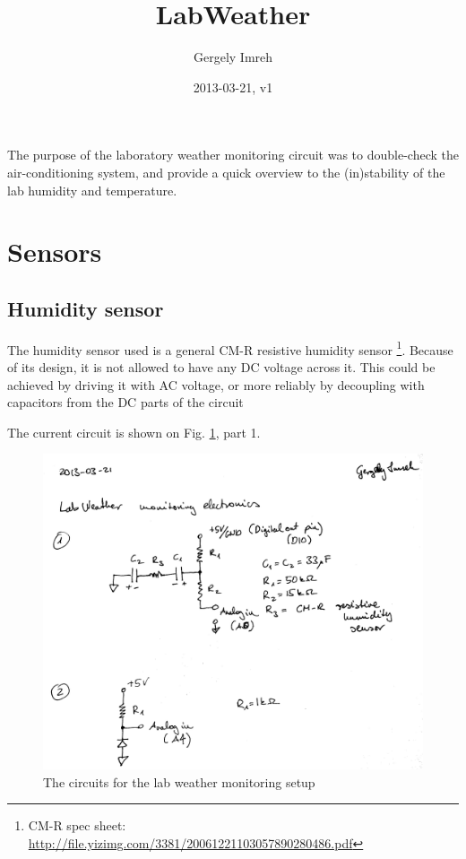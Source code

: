 \documentclass[12pt,a4paper]{article}
\author{Gergely Imreh}
\title{LabWeather}
\date{2013-03-21, v1}
\begin{document}
\maketitle

The purpose of the laboratory weather monitoring circuit was to double-check the air-conditioning system, and provide a quick overview to the (in)stability of the lab humidity and temperature.

\tableofcontents

\section{Sensors}

\subsection{Humidity sensor}

The humidity sensor used is a general CM-R resistive humidity sensor \footnote{CM-R spec sheet: \url{http://file.yizimg.com/3381/20061221103057890280486.pdf}}. Because of its design, it is not allowed to have any DC voltage across it. This could be achieved by driving it with AC voltage, or more reliably by decoupling with capacitors from the DC parts of the circuit

The current circuit is shown on Fig. \ref{fig:circuit}, part 1.

\begin{figure}[ht!]
\centering
\includegraphics[width=140mm]{circuit.jpg}
\caption{The circuits for the lab weather monitoring setup}
\label{fig:circuit}
\end{figure}
\end{document}
